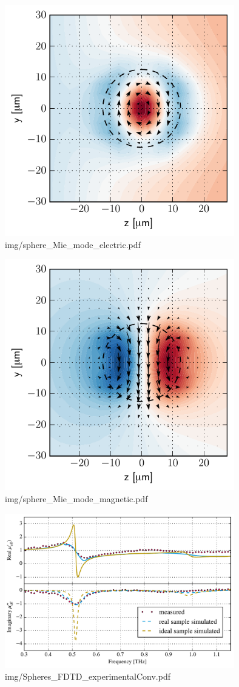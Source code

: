 \begin{figure} \caption{img/sphere\_Mie\_mode\_electric.pdf}  \centering \includegraphics[width=10cm]{img/sphere_Mie_mode_electric.pdf} \end{figure} \clearpage
\begin{figure} \caption{img/sphere\_Mie\_mode\_magnetic.pdf}  \centering \includegraphics[width=10cm]{img/sphere_Mie_mode_magnetic.pdf} \end{figure} \clearpage
\begin{figure} \caption{img/Spheres\_FDTD\_experimentalConv.pdf}  \centering \includegraphics[width=10cm]{img/Spheres_FDTD_experimentalConv.pdf} \end{figure} \clearpage

